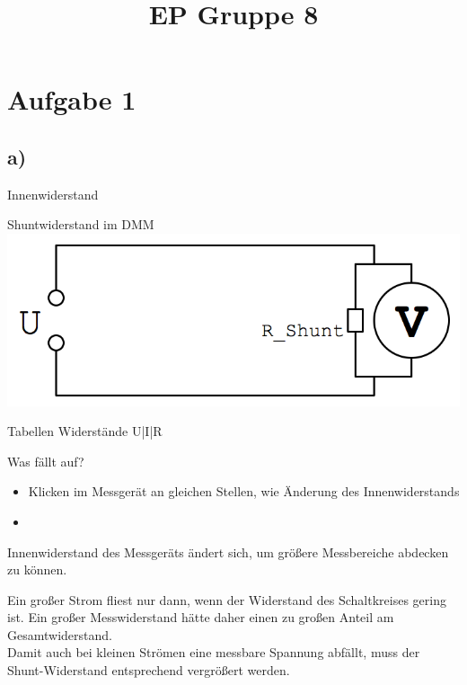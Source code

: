 \documentclass[compress,11pt]{beamer}
\title{EP Gruppe 8}
\begin{document}
\frame[c]{\titlepage}
\begin{frame}
\tableofcontents
\end{frame}

\section{Aufgabe 1}
\subsection{a)}
\begin{frame}{Innenwiderstand}
\begin{block}{Shuntwiderstand im DMM}
\includegraphics[width=\textwidth]{images/1a.png} %
\end{block}
\end{frame}

\begin{frame}
Tabellen Widerstände U|I|R
\end{frame}

\begin{frame}
\end{frame}


\begin{frame}
\begin{block}{Was fällt auf?}
\begin{itemize}
\item Klicken im Messgerät an gleichen Stellen, wie Änderung des Innenwiderstands
\item 
\end{itemize}
Innenwiderstand des Messgeräts ändert sich, um größere Messbereiche abdecken zu können.
\end{block}
\end{frame}


\begin{frame}
Ein großer Strom fliest nur dann, wenn der Widerstand des Schaltkreises gering ist. Ein großer Messwiderstand hätte daher einen zu großen Anteil am Gesamtwiderstand.\\
Damit auch bei kleinen Strömen eine messbare Spannung abfällt, muss der Shunt-Widerstand entsprechend vergrößert werden.
\end{frame}
\end{document}

